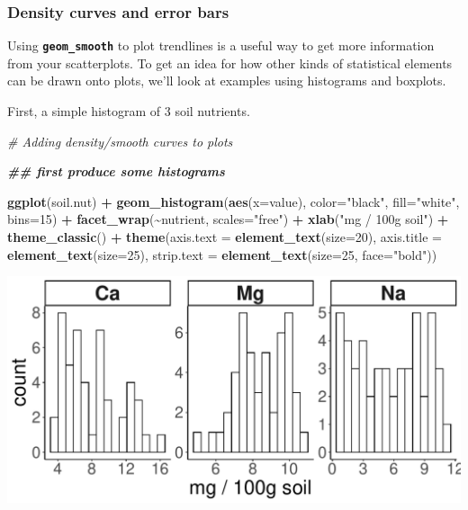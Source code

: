 \documentclass[
]{article}
\newenvironment{Shaded}{\begin{snugshade}}{\end{snugshade}}
\newcommand{\AttributeTok}[1]{\textcolor[rgb]{0.13,0.29,0.53}{#1}}
\newcommand{\CommentTok}[1]{\textcolor[rgb]{0.56,0.35,0.01}{\textit{#1}}}
\newcommand{\DecValTok}[1]{\textcolor[rgb]{0.00,0.00,0.81}{#1}}
\newcommand{\DocumentationTok}[1]{\textcolor[rgb]{0.56,0.35,0.01}{\textbf{\textit{#1}}}}
\newcommand{\FunctionTok}[1]{\textcolor[rgb]{0.13,0.29,0.53}{\textbf{#1}}}
\newcommand{\NormalTok}[1]{#1}
\newcommand{\SpecialCharTok}[1]{\textcolor[rgb]{0.81,0.36,0.00}{\textbf{#1}}}
\newcommand{\StringTok}[1]{\textcolor[rgb]{0.31,0.60,0.02}{#1}}
\begin{document}
\hypertarget{density-curves-and-error-bars}{%
\subsubsection{Density curves and error
bars}\label{density-curves-and-error-bars}}

Using \textbf{\texttt{geom\_smooth}} to plot trendlines is a useful way
to get more information from your scatterplots. To get an idea for how
other kinds of statistical elements can be drawn onto plots, we'll look
at examples using histograms and boxplots.

First, a simple histogram of 3 soil nutrients.

\begin{Shaded}
\begin{Highlighting}[]
\CommentTok{\# Adding density/smooth curves to plots}

   \DocumentationTok{\#\# first produce some histograms}

\FunctionTok{ggplot}\NormalTok{(soil.nut) }\SpecialCharTok{+}
  \FunctionTok{geom\_histogram}\NormalTok{(}\FunctionTok{aes}\NormalTok{(}\AttributeTok{x=}\NormalTok{value), }\AttributeTok{color=}\StringTok{"black"}\NormalTok{, }\AttributeTok{fill=}\StringTok{"white"}\NormalTok{, }\AttributeTok{bins=}\DecValTok{15}\NormalTok{) }\SpecialCharTok{+}
  \FunctionTok{facet\_wrap}\NormalTok{(}\SpecialCharTok{\textasciitilde{}}\NormalTok{nutrient, }\AttributeTok{scales=}\StringTok{"free"}\NormalTok{) }\SpecialCharTok{+}
  \FunctionTok{xlab}\NormalTok{(}\StringTok{"mg / 100g soil"}\NormalTok{) }\SpecialCharTok{+}
  \FunctionTok{theme\_classic}\NormalTok{() }\SpecialCharTok{+}
  \FunctionTok{theme}\NormalTok{(}\AttributeTok{axis.text =} \FunctionTok{element\_text}\NormalTok{(}\AttributeTok{size=}\DecValTok{20}\NormalTok{),}
        \AttributeTok{axis.title =} \FunctionTok{element\_text}\NormalTok{(}\AttributeTok{size=}\DecValTok{25}\NormalTok{),}
        \AttributeTok{strip.text =} \FunctionTok{element\_text}\NormalTok{(}\AttributeTok{size=}\DecValTok{25}\NormalTok{, }\AttributeTok{face=}\StringTok{"bold"}\NormalTok{))}
\end{Highlighting}
\end{Shaded}

\includegraphics{module1_3_files/figure-latex/unnamed-chunk-37-1.pdf}
\end{document}
